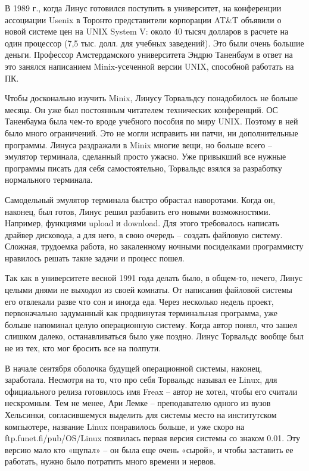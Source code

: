 \documentclass[14pt]{article}
\begin{document}
    В 1989 г., когда Линус готовился поступить в университет, на конференции ассоциации Usenix в Торонто представители корпорации AT\&T объявили о новой системе цен на UNIX System V: около 40 тысяч долларов в расчете на один процессор (7,5 тыс. долл. для учебных заведений).
    Это были очень большие деньги.
    Профессор Амстердамского университета Эндрю Таненбаум в ответ на это занялся написанием Minix-усеченной версии UNIX, способной работать на ПК.

    Чтобы досконально изучить Minix, Линусу Торвальдсу понадобилось не больше месяца.
    Он уже был постоянным читателем технических конференций.
    ОС Таненбаума была чем-то вроде учебного пособия по миру UNIX.
    Поэтому в ней было много ограничений.
    Это не могли исправить ни патчи, ни дополнительные программы.
    Линуса раздражали в Minix многие вещи, но больше всего – эмулятор терминала, сделанный просто ужасно.
    Уже привыкший все нужные программы писать для себя самостоятельно, Торвальдс взялся за разработку нормального терминала.

    Самодельный эмулятор терминала быстро обрастал наворотами.
    Когда он, наконец, был готов, Линус решил разбавить его новыми возможностями.
    Например, функциями upload и download.
    Для этого требовалось написать драйвер дисковода, а для него, в свою очередь – создать файловую систему.
    Сложная, трудоемка работа, но закаленному ночными посиделками программисту нравилось решать такие задачи и процесс пошел.

    Так как в университете весной 1991 года делать было, в общем-то, нечего, Линус целыми днями не выходил из своей комнаты.
    От написания файловой системы его отвлекали разве что сон и иногда еда.
    Через несколько недель проект, первоначально задуманный как продвинутая терминальная программа, уже больше напоминал целую операционную систему.
    Когда автор понял, что зашел слишком далеко, останавливаться было уже поздно.
    Линус Торвальдс вообще был не из тех, кто мог бросить все на полпути.

    В начале сентября оболочка будущей операционной системы, наконец, заработала.
    Несмотря на то, что про себя Торвальдс называл ее Linux, для официального релиза готовилось имя Freax – автор не хотел, чтобы его считали нескромным.
    Тем не менее, Ари Лемке – преподавателю одного из вузов Хельсинки, согласившемуся выделить для системы место на институтском компьютере, название Linux понравилось больше, и уже скоро на ftp.funet.fi/pub/OS/Linux появилась первая версия системы со знаком 0.01.
    Эту версию мало кто «щупал» – он была еще очень «сырой», и чтобы заставить ее работать, нужно было потратить много времени и нервов.
\end{document}
